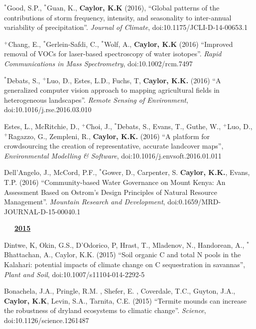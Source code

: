 \documentclass[10pt]{report}
\begin{document}
\begin{etaremune}
\item $^{*}$Good, S.P.,  $^{*}$Guan, K.,  \textbf{Caylor, K.K} (2016), ``Global patterns of the contributions of storm frequency, intensity, and seasonality to inter-annual variability of precipitation''. {\em Journal of Climate}, doi:10.1175/JCLI-D-14-00653.1

\item  $^{+}$Chang, E., $^{*}$Gerlein-Safdi, C., $^{*}$Wolf, A.,  \textbf{Caylor, K.K} (2016) ``Improved removal of VOCs for laser-based spectroscopy of water isotopes''. {\em Rapid Communications in Mass Spectrometry}, doi:10.1002/rcm.7497

\item  $^{*}$Debats, S., $^{+}$Luo, D., Estes, L.D., Fuchs, T, \textbf{Caylor, K.K.} (2016) ``A generalized computer vision approach to mapping agricultural fields in heterogeneous landscapes''. {\em Remote Sensing of Environment}, doi:10.1016/j.rse.2016.03.010

\item  Estes, L., McRitchie, D., $^{+}$Choi, J., $^{*}$Debats, S.,  Evans, T., Guthe, W., $^{+}$Luo, D., $^{+}$Ragazzo, G., Zempleni, R., \textbf{Caylor, K.K.} (2016) ``A platform for crowdsourcing the creation of representative, accurate landcover maps'', {\em Environmental Modelling \& Software}, doi:10.1016/j.envsoft.2016.01.011

\item Dell'Angelo, J., McCord, P.F.,  $^{*}$Gower, D., Carpenter, S. \textbf{Caylor, K.K.}, Evans, T.P. (2016) ``Community-based Water Governance on Mount Kenya: An Assessment Based on Ostrom's Design Principles of Natural Resource Management''. {\em Mountain Research and Development}, doi:0.1659/MRD-JOURNAL-D-15-00040.1


\mbox{\ \ \ \underline{\textbf{2015}}}

\item Dintwe, K, Okin, G.S., D'Odorico, P, Hrast, T., Mladenov, N., Handorean, A.,  $^{*}$Bhattachan, A., Caylor, K.K. (2015) ``Soil organic C and total N pools in the Kalahari: potential impacts of climate change on C sequestration in savannas'', {\em Plant and Soil}, doi:10.1007/s11104-014-2292-5

\item Bonachela, J.A., Pringle, R.M. , Shefer, E. , Coverdale, T.C., Guyton,  J.A.,  \textbf{Caylor, K.K}, Levin, S.A., Tarnita, C.E.  (2015) ``Termite mounds can increase the robustness of dryland ecosystems to climatic change''. {\em Science}, doi:10.1126/science.1261487


\end{etaremune}
\end{document}
